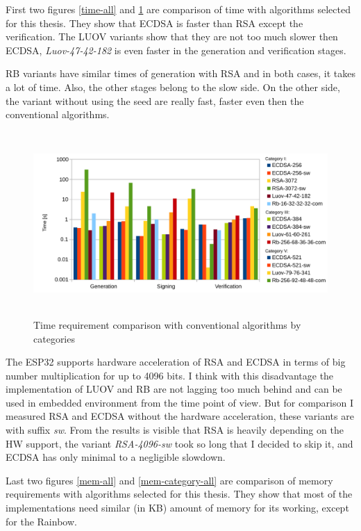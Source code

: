 \documentclass[thesis=M,english]{FITthesis}[2019/12/23]
\begin{document}
\noindent
First two figures \ref{time-all} and \ref{time-category-all} are comparison of time with algorithms selected for this thesis. They show that ECDSA is faster than RSA except the verification. The LUOV variants show that they are not too much slower then ECDSA, \textit{Luov-47-42-182} is even faster in the generation and verification stages.

\bigskip
\noindent
RB variants have similar times of generation with RSA and in both cases, it takes a lot of time. Also, the other stages belong to the slow side. On the other side, the variant without using the seed are really fast, faster even then the conventional algorithms.

\begin{figure}[H]
\centering
\includegraphics[width=13cm,height=7cm]{images/time-category-all.pdf}
\caption{Time requirement comparison with conventional algorithms by categories}
\label{time-category-all}
\end{figure}

\bigskip
\noindent
The ESP32 supports hardware acceleration of RSA and ECDSA in terms of big number multiplication for up to 4096 bits. I think with this disadvantage the implementation of LUOV and RB are not lagging too much behind and can be used in embedded environment from the time point of view. But for comparison I measured RSA and ECDSA without the hardware acceleration, these variants are with suffix \textit{sw}. From the results is visible that RSA is heavily depending on the HW support, the variant \textit{RSA-4096-sw} took so long that I decided to skip it, and ECDSA has only minimal to a negligible slowdown.

\bigskip
\noindent
Last two figures \ref{mem-all} and \ref{mem-category-all} are comparison of memory requirements with algorithms selected for this thesis. They show that most of the implementations need similar (in KB) amount of memory for its working, except for the Rainbow.
\end{document}
